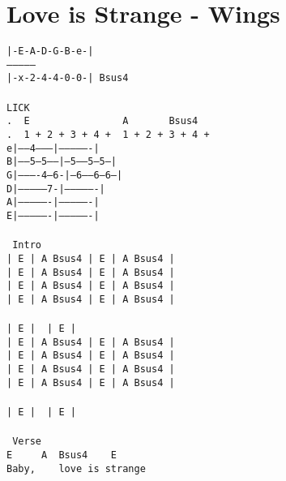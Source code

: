 \newpage
\section{Love is Strange - Wings}
\label{Love is Strange - Wings}
\texttt{|-E-A-D-G-B-e-|\\
---------------\\
|-x-2-4-4-0-0-| Bsus4\\
\\
LICK\\
.\ \ E\ \ \ \ \ \ \ \ \ \ \ \ \ \ \ \ A\ \ \ \ \ \ \ Bsus4\\
.\ \ 1\ +\ 2\ +\ 3\ +\ 4\ +\ \ 1\ +\ 2\ +\ 3\ +\ 4\ +\ \ \\
e|------4---------|----------------|\\
B|------5---5-----|--5-----5---5---|\\
G|----------4---6-|--6-----6---6---|\\
D|--------------7-|----------------|\\
A|----------------|----------------|\\
E|----------------|----------------|\\
\\
\lbrack\ Intro\rbrack\\
|\ E\ |\ A\ Bsus4\ |\ E\ |\ A\ Bsus4\ |\\
|\ E\ |\ A\ Bsus4\ |\ E\ |\ A\ Bsus4\ |\\
|\ E\ |\ A\ Bsus4\ |\ E\ |\ A\ Bsus4\ |\\
|\ E\ |\ A\ Bsus4\ |\ E\ |\ A\ Bsus4\ |\\
\\
|\ E\ |\ %
|\ E\ |\ %
\\
|\ E\ |\ A\ Bsus4\ |\ E\ |\ A\ Bsus4\ |\\
|\ E\ |\ A\ Bsus4\ |\ E\ |\ A\ Bsus4\ |\\
|\ E\ |\ A\ Bsus4\ |\ E\ |\ A\ Bsus4\ |\\
|\ E\ |\ A\ Bsus4\ |\ E\ |\ A\ Bsus4\ |\\
\\
|\ E\ |\ %
|\ E\ |\ %
\\
\\
\lbrack\ Verse\rbrack\\
E\ \ \ \ \ A\ \ Bsus4\ \ \lbrack\ \ E\ \rbrack\ \\
Baby,\ \ \ \ love\ is\ strange\\
}
